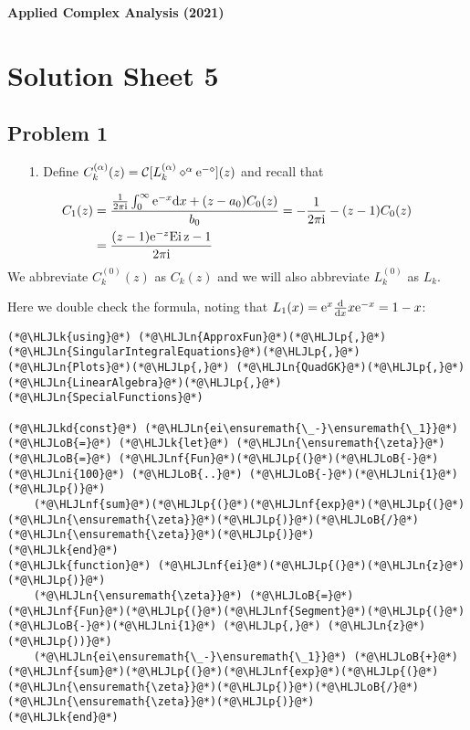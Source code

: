\documentclass[12pt,landscape]{article}
\newcommand{\HLJLk}[1]{\textcolor[RGB]{148,91,176}{\textbf{#1}}}
\newcommand{\HLJLkd}[1]{\textcolor[RGB]{214,102,97}{\textit{#1}}}
\newcommand{\HLJLn}[1]{#1}
\newcommand{\HLJLnf}[1]{\textcolor[RGB]{66,102,213}{#1}}
\newcommand{\HLJLni}[1]{\textcolor[RGB]{59,151,46}{#1}}
\newcommand{\HLJLoB}[1]{\textcolor[RGB]{102,102,102}{\textbf{#1}}}
\newcommand{\HLJLp}[1]{#1}
\def\D{ {\rm d} }
\def\I{ {\rm i} }
\def\E{ {\rm e} }
\def\CC{ {\cal C} }
\def\Ei{ {\rm Ei}\, }
\def\dx{\D x}
\def\Ei{\rm Ei\,}
\begin{document}
{\LARGE
\sf
\textbf{Applied Complex Analysis (2021)}

\section{Solution Sheet 5}
\subsection{Problem 1}
\begin{itemize}
\item[1. ] Define $C_k^{(\alpha)}(z) = \CC[L_k^{(\alpha)} \diamond^\alpha \E^{-\diamond}](z)$ and recall that

\end{itemize}

\begin{align*}
C_1(z)  &= {{1 \over 2 \pi \I} \int_0^\infty \E^{-x} \dx + (z-a_0) C_0(z) \over b_0} = -{1 \over 2 \pi \I}  - (z-1) C_0(z)    \\
&= {(z-1) \E^{-z} \Ei z -1 \over 2 \pi \I}
\end{align*}
We abbreviate $C_k^{(0)}(z)$ as $C_k(z)$ and we will also abbreviate $L_k^{(0)}$ as $L_k$.

Here we double check the formula, noting that $L_1(x) = \E^x {\D \over \dx} x \E^{-x} = 1 - x$:


\begin{lstlisting}
(*@\HLJLk{using}@*) (*@\HLJLn{ApproxFun}@*)(*@\HLJLp{,}@*) (*@\HLJLn{SingularIntegralEquations}@*)(*@\HLJLp{,}@*) (*@\HLJLn{Plots}@*)(*@\HLJLp{,}@*) (*@\HLJLn{QuadGK}@*)(*@\HLJLp{,}@*) (*@\HLJLn{LinearAlgebra}@*)(*@\HLJLp{,}@*) (*@\HLJLn{SpecialFunctions}@*)

(*@\HLJLkd{const}@*) (*@\HLJLn{ei\ensuremath{\_-}\ensuremath{\_1}}@*) (*@\HLJLoB{=}@*) (*@\HLJLk{let}@*) (*@\HLJLn{\ensuremath{\zeta}}@*) (*@\HLJLoB{=}@*) (*@\HLJLnf{Fun}@*)(*@\HLJLp{(}@*)(*@\HLJLoB{-}@*)(*@\HLJLni{100}@*) (*@\HLJLoB{..}@*) (*@\HLJLoB{-}@*)(*@\HLJLni{1}@*)(*@\HLJLp{)}@*)
    (*@\HLJLnf{sum}@*)(*@\HLJLp{(}@*)(*@\HLJLnf{exp}@*)(*@\HLJLp{(}@*)(*@\HLJLn{\ensuremath{\zeta}}@*)(*@\HLJLp{)}@*)(*@\HLJLoB{/}@*)(*@\HLJLn{\ensuremath{\zeta}}@*)(*@\HLJLp{)}@*)
(*@\HLJLk{end}@*)
(*@\HLJLk{function}@*) (*@\HLJLnf{ei}@*)(*@\HLJLp{(}@*)(*@\HLJLn{z}@*)(*@\HLJLp{)}@*)
    (*@\HLJLn{\ensuremath{\zeta}}@*) (*@\HLJLoB{=}@*) (*@\HLJLnf{Fun}@*)(*@\HLJLp{(}@*)(*@\HLJLnf{Segment}@*)(*@\HLJLp{(}@*)(*@\HLJLoB{-}@*)(*@\HLJLni{1}@*) (*@\HLJLp{,}@*) (*@\HLJLn{z}@*)(*@\HLJLp{))}@*)
    (*@\HLJLn{ei\ensuremath{\_-}\ensuremath{\_1}}@*) (*@\HLJLoB{+}@*) (*@\HLJLnf{sum}@*)(*@\HLJLp{(}@*)(*@\HLJLnf{exp}@*)(*@\HLJLp{(}@*)(*@\HLJLn{\ensuremath{\zeta}}@*)(*@\HLJLp{)}@*)(*@\HLJLoB{/}@*)(*@\HLJLn{\ensuremath{\zeta}}@*)(*@\HLJLp{)}@*)
(*@\HLJLk{end}@*)


\end{lstlisting}}
\end{document}
